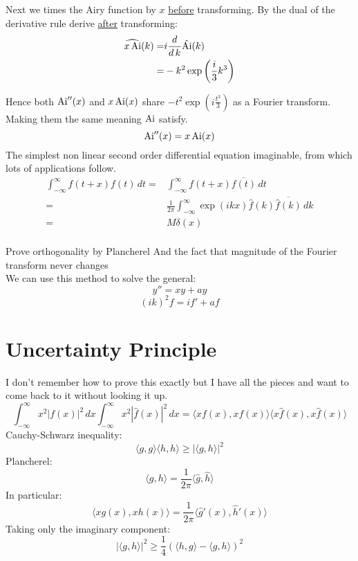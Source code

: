 Next we times the Airy function by $x$ \underline{before} transforming.
By the dual of the derivative rule derive \underline{after} transforming:
\begin{equation*}
\begin{aligned}
\widehat{x\operatorname{Ai}}(k) =& i\frac{d}{d\,k}\hat{\operatorname{Ai}}(k) \\
=&-k^2\exp\left(\frac{i}{3}k^3\right)\\
\end{aligned}
\end{equation*}


Hence both $\operatorname{Ai}''(x)$ and $x\operatorname{Ai}(x)$ share $-t^2\exp\left(i\frac{t^3}{3}\right)$ as a Fourier transform.
Making them the same meaning $\operatorname{Ai}$ satisfy.
\[\operatorname{Ai}''(x) = x\operatorname{Ai}(x)\]
The simplest non linear second order differential equation imaginable, from which lots of applications follow.
\\

\begin{equation*}
\begin{aligned}
\int_{-\infty}^{\infty}f(t+x)f(t)\,dt =&\int_{-\infty}^{\infty}f(t+x)\overline{f(t)}\,dt \\
=&\frac{1}{2\pi}\int_{-\infty}^{\infty}\exp(ikx)\hat{f}(k)\overline{\hat{f}(k)}\,dk \\
=&M\delta(x) \\
\end{aligned}
\end{equation*}

Prove orthogonality by Plancherel 
And the fact that magnitude of the Fourier transform never changes
\\

We can use this method to solve the general:
\[y'' = xy+ay\]
\[(ik)^2f = if'+af\]
\section{Uncertainty Principle}
I don't remember how to prove this exactly but I have all the pieces and want to come back to it without looking it up.
\[\int_{-\infty}^{\infty}x^2|f(x)|^2\,dx\int_{-\infty}^{\infty}x^2|\hat{f}(x)|^2\,dx = \langle xf(x),xf(x) \rangle \langle x\hat{f}(x), x\hat{f}(x) \rangle\]
Cauchy-Schwarz inequality:
\[\langle g,g \rangle\langle h,h\rangle \geq |\langle g,h \rangle|^2\]
Plancherel:
\[\langle g,h \rangle = \frac{1}{2\pi}\langle \hat{g},\hat{h}\rangle\]
In particular:
\[\langle xg(x),xh(x) \rangle = \frac{1}{2\pi}\langle \hat{g}'(x),\hat{h}'(x)\rangle\]
Taking only the imaginary component:
\[|\langle g,h \rangle|^2 \geq \frac{1}{4}(\langle h,g \rangle - \langle g,h \rangle)^2\]

